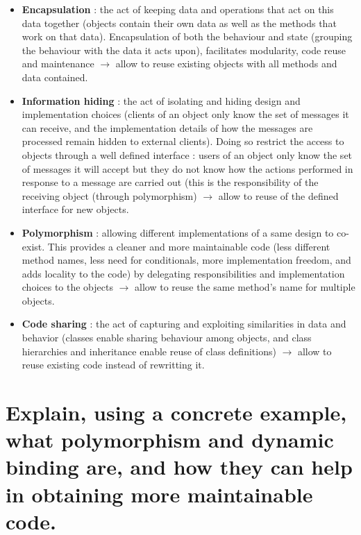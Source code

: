 \begin{itemize}
\item  \textbf{Encapsulation} : the act of keeping data and operations that act on this data together (objects contain their own data as well as the methods that work on that data). Encapsulation of both the behaviour and state (grouping the behaviour with the data it acts upon), facilitates modularity, code reuse and maintenance $\rightarrow$ allow to reuse existing objects with all methods and data contained.
\item  \textbf{Information hiding} : the act of isolating and hiding design and implementation choices (clients of an object only know the set of messages it can receive, and the implementation details of how the messages are processed remain hidden to external clients). Doing so restrict the access to objects through a well defined interface : users of an object only know the set of messages it will accept but they do not know how the actions performed in response to a message are carried out (this is the responsibility of the receiving object (through polymorphism) $\rightarrow$ allow to reuse of the defined interface for new objects.
\item  \textbf{Polymorphism} : allowing different implementations of a same design to co-exist. This provides a cleaner and more maintainable code (less different method names, less need for conditionals, more implementation freedom, and adds locality to the code)  by delegating responsibilities and implementation choices to the objects  $\rightarrow$ allow to reuse the same method's name for multiple objects.
\item  \textbf{Code sharing} : the act of capturing and exploiting similarities in data and behavior (classes enable sharing behaviour among objects, and class hierarchies and inheritance enable reuse of class definitions) $\rightarrow$ allow to reuse existing code instead of rewritting it.
\end{itemize}


\section{Explain, using a concrete example, what polymorphism and dynamic binding are, and how
they can help in obtaining more maintainable code.}

